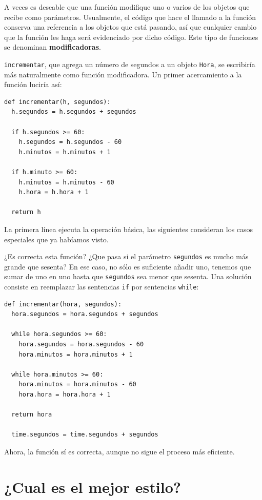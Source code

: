 A veces es deseable que una función modifique uno o varios de los
objetos que recibe como parámetros. Usualmente, el código que hace
el llamado a la función conserva una referencia a los objetos que
está pasando, así que cualquier cambio que la función les haga será
evidenciado por dicho código. Este tipo de funciones se denominan
\textbf{modificadoras}.

\texttt{incrementar}, que agrega un número de segundos a un objeto
\texttt{Hora}, se escribiría más naturalmente como función modificadora.
Un primer acercamiento a la función luciría así:
\begin{lstlisting}
def incrementar(h, segundos):
  h.segundos = h.segundos + segundos

  if h.segundos >= 60:
    h.segundos = h.segundos - 60
    h.minutos = h.minutos + 1

  if h.minuto >= 60:
    h.minutos = h.minutos - 60
    h.hora = h.hora + 1

  return h
\end{lstlisting}
La primera línea ejecuta la operación básica, las siguientes consideran
los casos especiales que ya habíamos visto.

¿Es correcta esta función? ¿Que pasa si el parámetro \texttt{segundos}
es mucho más grande que sesenta? En ese caso, no sólo es suficiente
añadir uno, tenemos que sumar de uno en uno hasta que \texttt{segundos}
sea menor que sesenta. Una solución consiste en reemplazar las sentencias
\texttt{if} por sentencias \texttt{while}:
\begin{lstlisting}
def incrementar(hora, segundos):
  hora.segundos = hora.segundos + segundos

  while hora.segundos >= 60:
    hora.segundos = hora.segundos - 60
    hora.minutos = hora.minutos + 1

  while hora.minutos >= 60:
    hora.minutos = hora.minutos - 60
    hora.hora = hora.hora + 1

  return hora

  time.segundos = time.segundos + segundos
\end{lstlisting}
Ahora, la función sí es correcta, aunque no sigue el proceso más eficiente.

\section{¿Cual es el mejor estilo?}

